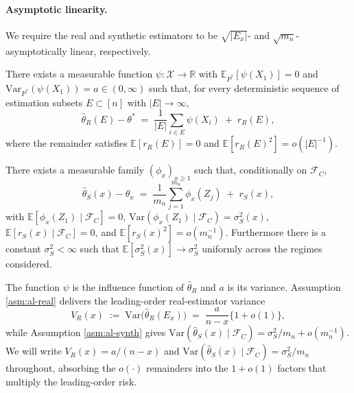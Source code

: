 \paragraph{Asymptotic linearity.}
We require the real and synthetic estimators to be $\sqrt{|E_x|}$- and $\sqrt{m_n}$-asymptotically linear, respectively.

\begin{assumption}\label{asm:al-real}
There exists a measurable function $\psi:\mathcal{X}\to\mathbb{R}$ with $\mathbb{E}_{P^*}[\psi(X_1)]=0$ and $\mathrm{Var}_{P^*}(\psi(X_1))=a\in(0,\infty)$ such that, for every deterministic sequence of estimation subsets $E\subset[n]$ with $|E|\to\infty$,
\begin{equation*}
\hat\theta_R(E)-\theta^* \;=\; \frac{1}{|E|}\sum_{i\in E}\psi(X_i) \;+\; r_R(E),
\end{equation*}
where the remainder satisfies $\mathbb{E}[r_R(E)]=0$ and $\mathbb{E}[r_R(E)^2]=o(|E|^{-1})$.
\end{assumption}

\begin{assumption}\label{asm:al-synth}
There exists a measurable family $(\phi_x)_{x\ge 1}$ such that, conditionally on $\mathcal{F}_C$,
\begin{equation*}
\hat\theta_S(x)-\theta_x \;=\; \frac{1}{m_n}\sum_{j=1}^{m_n}\phi_x(Z_j) \;+\; r_S(x),
\end{equation*}
with $\mathbb{E}[\phi_x(Z_1)\mid\mathcal{F}_C]=0$, $\mathrm{Var}(\phi_x(Z_1)\mid\mathcal{F}_C)=\sigma_S^2(x)$, $\mathbb{E}[r_S(x)\mid\mathcal{F}_C]=0$, and $\mathbb{E}[r_S(x)^2]=o(m_n^{-1})$. Furthermore there is a constant $\sigma_S^2<\infty$ such that $\mathbb{E}[\sigma_S^2(x)]\to\sigma_S^2$ uniformly across the regimes considered.
\end{assumption}

The function $\psi$ is the influence function of $\hat\theta_R$ and $a$ is its variance. Assumption \ref{asm:al-real} delivers the leading-order real-estimator variance
\begin{equation*}
V_R(x)\;:=\;\mathrm{Var}\bigl(\hat\theta_R(E_x)\bigr)\;=\;\frac{a}{n-x}\bigl\{1+o(1)\bigr\},
\end{equation*}
while Assumption \ref{asm:al-synth} gives $\mathrm{Var}(\hat\theta_S(x)\mid\mathcal{F}_C) = \sigma_S^2/m_n + o(m_n^{-1})$. We will write $V_R(x)=a/(n-x)$ and $\mathrm{Var}(\hat\theta_S(x)\mid\mathcal{F}_C) = \sigma_S^2/m_n$ throughout, absorbing the $o(\cdot)$ remainders into the $1+o(1)$ factors that multiply the leading-order risk.

